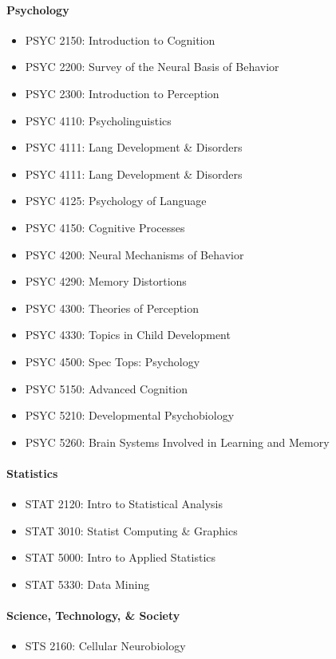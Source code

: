 \documentclass[10pt,letter]{book}
\newenvironment{itemlist}{
\begin{itemize}
\setlength{\itemsep}{0pt}
\setlength{\parskip}{0pt}}
{\end{itemize}}
\begin{document}
\paragraph{Psychology}
\begin{itemlist}
\item PSYC 2150: Introduction to Cognition
\item PSYC 2200: Survey of the Neural Basis of Behavior
\item PSYC 2300: Introduction to Perception
\item PSYC 4110: Psycholinguistics
\item PSYC 4111: Lang Development \& Disorders
\item PSYC 4111: Lang Development \& Disorders
\item PSYC 4125: Psychology of Language
\item PSYC 4150: Cognitive Processes
\item PSYC 4200: Neural Mechanisms of Behavior
\item PSYC 4290: Memory Distortions
\item PSYC 4300: Theories of Perception
\item PSYC 4330: Topics in Child Development
\item PSYC 4500: Spec Tops: Psychology
\item PSYC 5150: Advanced Cognition
\item PSYC 5210: Developmental Psychobiology
\item PSYC 5260: Brain Systems Involved in Learning and Memory
\end{itemlist}

\paragraph{Statistics}
\begin{itemlist}
\item STAT 2120: Intro to Statistical Analysis
\item STAT 3010: Statist Computing \& Graphics
\item STAT 5000: Intro to Applied Statistics
\item STAT 5330: Data Mining
\end{itemlist}

\paragraph{Science, Technology, \& Society}
\begin{itemlist}
\item STS 2160: Cellular Neurobiology
\end{itemlist}
\end{document}
